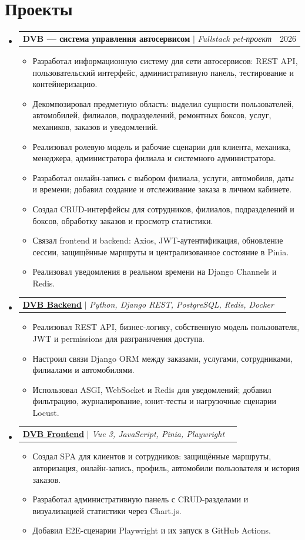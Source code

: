 \documentclass[a4paper,10pt]{article}
\makeatletter
\newcommand{\resumeItem}[1]{
  \item\small{{#1 \vspace{-2pt}}}
}
\newcommand{\resumeProjectHeading}[2]{
  \item
    \begin{tabular*}{0.97\textwidth}{l@{\extracolsep{\fill}}r}
      \small #1 & #2 \\
    \end{tabular*}\vspace{-7pt}
}
\newcommand{\resumeSubHeadingListStart}{\begin{itemize}[leftmargin=0.15in,label={}]}
\newcommand{\resumeSubHeadingListEnd}{\end{itemize}}
\newcommand{\resumeItemListStart}{\begin{itemize}[leftmargin=0.22in]}
\newcommand{\resumeItemListEnd}{\end{itemize}\vspace{-5pt}}
\makeatother
\begin{document}
\section{Проекты}
\resumeSubHeadingListStart
  \resumeProjectHeading
    {\textbf{DVB --- система управления автосервисом} $|$ \emph{Fullstack pet-проект}}{2026}
    \resumeItemListStart
      \resumeItem{Разработал информационную систему для сети автосервисов: REST API, пользовательский интерфейс, административную панель, тестирование и контейнеризацию.}
      \resumeItem{Декомпозировал предметную область: выделил сущности пользователей, автомобилей, филиалов, подразделений, ремонтных боксов, услуг, механиков, заказов и уведомлений.}
      \resumeItem{Реализовал ролевую модель и рабочие сценарии для клиента, механика, менеджера, администратора филиала и системного администратора.}
      \resumeItem{Разработал онлайн-запись с выбором филиала, услуги, автомобиля, даты и времени; добавил создание и отслеживание заказа в личном кабинете.}
      \resumeItem{Создал CRUD-интерфейсы для сотрудников, филиалов, подразделений и боксов, обработку заказов и просмотр статистики.}
      \resumeItem{Связал frontend и backend: Axios, JWT-аутентификация, обновление сессии, защищённые маршруты и централизованное состояние в Pinia.}
      \resumeItem{Реализовал уведомления в реальном времени на Django Channels и Redis.}
    \resumeItemListEnd

  \resumeProjectHeading
    {\href{https://github.com/MashumaroDev/DVB_Backend}{\textbf{DVB Backend}} $|$ \emph{Python, Django REST, PostgreSQL, Redis, Docker}}{}
    \resumeItemListStart
      \resumeItem{Реализовал REST API, бизнес-логику, собственную модель пользователя, JWT и permissions для разграничения доступа.}
      \resumeItem{Настроил связи Django ORM между заказами, услугами, сотрудниками, филиалами и автомобилями.}
      \resumeItem{Использовал ASGI, WebSocket и Redis для уведомлений; добавил фильтрацию, журналирование, юнит-тесты и нагрузочные сценарии Locust.}
    \resumeItemListEnd

  \resumeProjectHeading
    {\href{https://github.com/MashumaroDev/DVB_Frontend}{\textbf{DVB Frontend}} $|$ \emph{Vue 3, JavaScript, Pinia, Playwright}}{}
    \resumeItemListStart
      \resumeItem{Создал SPA для клиентов и сотрудников: защищённые маршруты, авторизация, онлайн-запись, профиль, автомобили пользователя и история заказов.}
      \resumeItem{Разработал административную панель с CRUD-разделами и визуализацией статистики через Chart.js.}
      \resumeItem{Добавил E2E-сценарии Playwright и их запуск в GitHub Actions.}
    \resumeItemListEnd
\resumeSubHeadingListEnd
\end{document}
